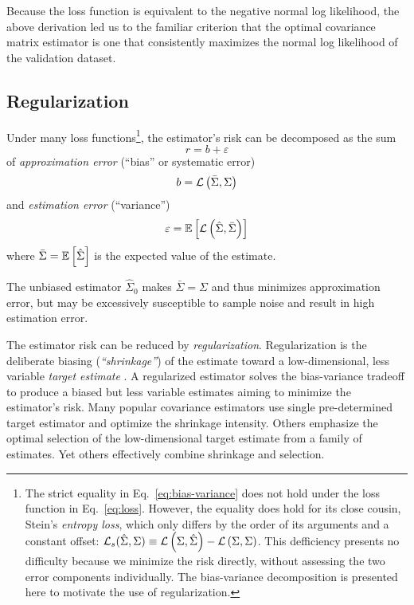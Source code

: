 Because the loss function is equivalent to the negative normal log likelihood, the above derivation led us to the familiar criterion that the optimal covariance matrix estimator is one that consistently maximizes the normal log likelihood of the validation dataset.

\subsection*{Regularization}
Under many loss functions\footnote{
The strict equality in Eq.~\ref{eq:bias-variance} does not hold under the loss function in Eq.~\ref{eq:loss}. However, the equality does hold for its close cousin, Stein's \emph{entropy loss},  which only differs by the order of its arguments and a constant offset: $\mathcal L_s(\hat\Sigma,\Sigma) \equiv \mathcal L\left(\Sigma,\hat\Sigma\right) - \mathcal L\left(\Sigma,\Sigma\right)$. This defficiency presents no difficulty because we minimize the risk directly, without assessing the two error components individually. The bias-variance decomposition is presented here to motivate the use of regularization.}, 
the estimator's risk can be decomposed as the sum
\begin{equation}\label{eq:bias-variance}
r = b + \varepsilon
\end{equation}
of \emph{approximation error} (``bias'' or systematic error)
\begin{equation}
b = \mathcal L\left(\bar\Sigma,\Sigma\right)
\end{equation}
and \emph{estimation error} (``variance'') 
\begin{equation}
\varepsilon = \mathbb E\left[ \mathcal L\left(\hat\Sigma, \bar\Sigma\right)\right]
\end{equation}
where $\bar\Sigma = \mathbb E\left[ \hat\Sigma\right]$ is the expected value of the estimate. 

The unbiased estimator $\hat\Sigma_0$ makes $\bar\Sigma=\Sigma$ and thus minimizes  approximation error, but may be excessively susceptible to sample noise and result in high estimation error.

The estimator risk can be reduced by \emph{regularization}. Regularization is the deliberate biasing (\emph{``shrinkage''}) of the estimate toward a low-dimensional, less variable \emph{target estimate} \cite{Bickel:2006,Ledoit:2004}. A regularized estimator solves the bias-variance tradeoff to produce a biased but less variable estimates aiming to minimize the estimator's risk.  Many popular covariance estimators use single pre-determined target estimator and optimize the shrinkage intensity.  Others emphasize the optimal selection of the low-dimensional target estimate from a family of estimates. Yet others effectively combine shrinkage and selection.

